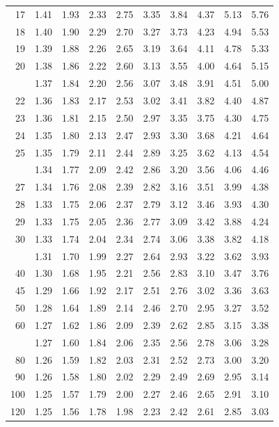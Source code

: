 \documentclass[10pt]{article}
\begin{document}
\begin{longtable}{@{}r!{\vrule width 0.8pt\hspace{0.55em}}rrrrrrrrr@{}}
17 & 1.41 & 1.93 & 2.33 & 2.75 & 3.35 & 3.84 & 4.37 & 5.13 & 5.76 \\
18 & 1.40 & 1.90 & 2.29 & 2.70 & 3.27 & 3.73 & 4.23 & 4.94 & 5.53 \\
19 & 1.39 & 1.88 & 2.26 & 2.65 & 3.19 & 3.64 & 4.11 & 4.78 & 5.33 \\
20 & 1.38 & 1.86 & 2.22 & 2.60 & 3.13 & 3.55 & 4.00 & 4.64 & 5.15 \\
 & 1.37 & 1.84 & 2.20 & 2.56 & 3.07 & 3.48 & 3.91 & 4.51 & 5.00 \\
22 & 1.36 & 1.83 & 2.17 & 2.53 & 3.02 & 3.41 & 3.82 & 4.40 & 4.87 \\
23 & 1.36 & 1.81 & 2.15 & 2.50 & 2.97 & 3.35 & 3.75 & 4.30 & 4.75 \\
24 & 1.35 & 1.80 & 2.13 & 2.47 & 2.93 & 3.30 & 3.68 & 4.21 & 4.64 \\
25 & 1.35 & 1.79 & 2.11 & 2.44 & 2.89 & 3.25 & 3.62 & 4.13 & 4.54 \\
 & 1.34 & 1.77 & 2.09 & 2.42 & 2.86 & 3.20 & 3.56 & 4.06 & 4.46 \\
27 & 1.34 & 1.76 & 2.08 & 2.39 & 2.82 & 3.16 & 3.51 & 3.99 & 4.38 \\
28 & 1.33 & 1.75 & 2.06 & 2.37 & 2.79 & 3.12 & 3.46 & 3.93 & 4.30 \\
29 & 1.33 & 1.75 & 2.05 & 2.36 & 2.77 & 3.09 & 3.42 & 3.88 & 4.24 \\
30 & 1.33 & 1.74 & 2.04 & 2.34 & 2.74 & 3.06 & 3.38 & 3.82 & 4.18 \\
 & 1.31 & 1.70 & 1.99 & 2.27 & 2.64 & 2.93 & 3.22 & 3.62 & 3.93 \\
40 & 1.30 & 1.68 & 1.95 & 2.21 & 2.56 & 2.83 & 3.10 & 3.47 & 3.76 \\
45 & 1.29 & 1.66 & 1.92 & 2.17 & 2.51 & 2.76 & 3.02 & 3.36 & 3.63 \\
50 & 1.28 & 1.64 & 1.89 & 2.14 & 2.46 & 2.70 & 2.95 & 3.27 & 3.52 \\
60 & 1.27 & 1.62 & 1.86 & 2.09 & 2.39 & 2.62 & 2.85 & 3.15 & 3.38 \\
 & 1.27 & 1.60 & 1.84 & 2.06 & 2.35 & 2.56 & 2.78 & 3.06 & 3.28 \\
80 & 1.26 & 1.59 & 1.82 & 2.03 & 2.31 & 2.52 & 2.73 & 3.00 & 3.20 \\
90 & 1.26 & 1.58 & 1.80 & 2.02 & 2.29 & 2.49 & 2.69 & 2.95 & 3.14 \\
100 & 1.25 & 1.57 & 1.79 & 2.00 & 2.27 & 2.46 & 2.65 & 2.91 & 3.10 \\
120 & 1.25 & 1.56 & 1.78 & 1.98 & 2.23 & 2.42 & 2.61 & 2.85 & 3.03 \\

\end{longtable}
\end{document}
